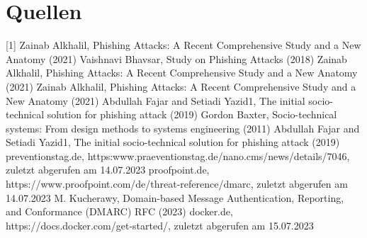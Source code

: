 \documentclass[journal=tosc,final]{iacrtrans}
\begin{document}
\section{Quellen}
[1] Zainab Alkhalil, Phishing Attacks: A Recent Comprehensive Study and a New Anatomy (2021) 
\newline
[2] Vaishnavi Bhavsar, Study on Phishing Attacks (2018)
\newline
[3] Zainab Alkhalil, Phishing Attacks: A Recent Comprehensive Study and a New Anatomy (2021)
\newline
[4] Zainab Alkhalil, Phishing Attacks: A Recent Comprehensive Study and a New Anatomy (2021) 
\newline
[5-9] Abdullah Fajar and Setiadi Yazid1, The initial socio-technical solution for phishing attack (2019)
\newline
[10,11] Gordon Baxter, Socio-technical systems: From design methods to systems engineering (2011)
\newline
[12] Abdullah Fajar and Setiadi Yazid1, The initial socio-technical solution for phishing attack (2019)
\newline
[13] preventionstag.de, https:\/\/www.praeventionstag.de/nano.cms/news/details/7046, zuletzt abgerufen am 14.07.2023
\newline
[14-16] proofpoint.de, https://www.proofpoint.com/de/threat-reference/dmarc, zuletzt abgerufen am 14.07.2023
\newline
[17] M. Kucherawy, Domain-based Message Authentication, Reporting, and Conformance (DMARC) RFC (2023)
\newline
[18] docker.de, https://docs.docker.com/get-started/, zuletzt abgerufen am 15.07.2023
\end{document}
